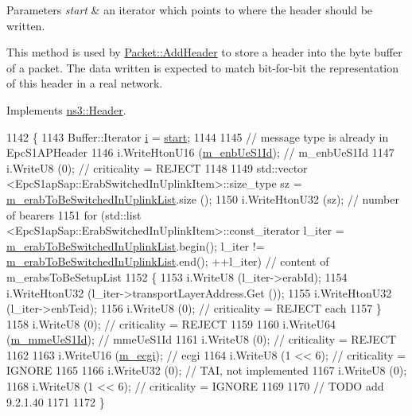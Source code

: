 \begin{DoxyParams}{Parameters}
{\em start} & an iterator which points to where the header should be written.\\
\hline
\end{DoxyParams}
This method is used by \hyperlink{classns3_1_1Packet_a465108c595a0bc592095cbcab1832ed8}{Packet\+::\+Add\+Header} to store a header into the byte buffer of a packet. The data written is expected to match bit-\/for-\/bit the representation of this header in a real network. 

Implements \hyperlink{classns3_1_1Header_afb61f1aac69ff8349a6bfe521fab5404}{ns3\+::\+Header}.


\begin{DoxyCode}
1142 \{
1143   Buffer::Iterator \hyperlink{bernuolliDistribution_8m_a6f6ccfcf58b31cb6412107d9d5281426}{i} = \hyperlink{namespacevisualizer_1_1core_a2a35e5d8a34af358b508dac8635754e0}{start};
1144 
1145   \textcolor{comment}{// message type is already in EpcS1APHeader }
1146   i.WriteHtonU16 (\hyperlink{classns3_1_1EpcS1APPathSwitchRequestAcknowledgeHeader_a1f2e10e79ee3cda4079736bf8d35114e}{m\_enbUeS1Id});     \textcolor{comment}{// m\_enbUeS1Id}
1147   i.WriteU8 (0);               \textcolor{comment}{// criticality = REJECT}
1148 
1149   std::vector <EpcS1apSap::ErabSwitchedInUplinkItem>::size\_type sz = 
      \hyperlink{classns3_1_1EpcS1APPathSwitchRequestAcknowledgeHeader_a6a39047dd91a079998d2e261d4b4c5e0}{m\_erabToBeSwitchedInUplinkList}.size (); 
1150   i.WriteHtonU32 (sz);              \textcolor{comment}{// number of bearers}
1151   \textcolor{keywordflow}{for} (std::list <EpcS1apSap::ErabSwitchedInUplinkItem>::const\_iterator l\_iter = 
      \hyperlink{classns3_1_1EpcS1APPathSwitchRequestAcknowledgeHeader_a6a39047dd91a079998d2e261d4b4c5e0}{m\_erabToBeSwitchedInUplinkList}.begin(); l\_iter != 
      \hyperlink{classns3_1_1EpcS1APPathSwitchRequestAcknowledgeHeader_a6a39047dd91a079998d2e261d4b4c5e0}{m\_erabToBeSwitchedInUplinkList}.end(); ++l\_iter) \textcolor{comment}{// content of
       m\_erabsToBeSetupList}
1152   \{
1153     i.WriteU8 (l\_iter->erabId);
1154     i.WriteHtonU32 (l\_iter->transportLayerAddress.Get ());
1155     i.WriteHtonU32 (l\_iter->enbTeid);
1156     i.WriteU8 (0);               \textcolor{comment}{// criticality = REJECT each}
1157   \}
1158   i.WriteU8 (0);               \textcolor{comment}{// criticality = REJECT}
1159 
1160   i.WriteU64 (\hyperlink{classns3_1_1EpcS1APPathSwitchRequestAcknowledgeHeader_a5e3e51c30edadc0174d3e17f1dfc35f6}{m\_mmeUeS1Id});         \textcolor{comment}{// mmeUeS1Id}
1161   i.WriteU8 (0);               \textcolor{comment}{// criticality = REJECT}
1162 
1163   i.WriteU16 (\hyperlink{classns3_1_1EpcS1APPathSwitchRequestAcknowledgeHeader_a513cd2cb4a04bb44128045a7e1538c0f}{m\_ecgi});      \textcolor{comment}{// ecgi}
1164   i.WriteU8 (1 << 6);       \textcolor{comment}{// criticality = IGNORE}
1165 
1166   i.WriteU32 (0);                   \textcolor{comment}{// TAI, not implemented}
1167   i.WriteU8 (0);
1168   i.WriteU8 (1 << 6);               \textcolor{comment}{// criticality = IGNORE}
1169 
1170   \textcolor{comment}{// TODO add 9.2.1.40}
1171 
1172 \}
\end{DoxyCode}


